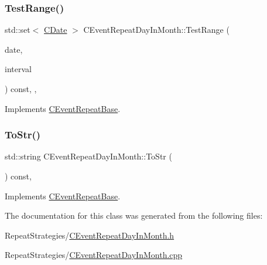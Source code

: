 \subsubsection{\texorpdfstring{Test\+Range()}{TestRange()}}
{\footnotesize\ttfamily std\+::set$<$ \mbox{\hyperlink{class_c_date}{C\+Date}} $>$ C\+Event\+Repeat\+Day\+In\+Month\+::\+Test\+Range (\begin{DoxyParamCaption}\item[{const \mbox{\hyperlink{class_c_date}{C\+Date}} \&}]{date,  }\item[{const \mbox{\hyperlink{class_c_date_af23472c977b14ed341b48183ec19d874}{C\+Date\+::\+Interval}} \&}]{interval }\end{DoxyParamCaption}) const\hspace{0.3cm}{\ttfamily [override]}, {\ttfamily [protected]}, {\ttfamily [virtual]}}



Implements \mbox{\hyperlink{class_c_event_repeat_base_ad8371820b1c9771c93b452e4c80f4cea}{C\+Event\+Repeat\+Base}}.

\mbox{\label{class_c_event_repeat_day_in_month_a5ec4554d0d7c1c9a50cd1f37f0d76673}} 
\subsubsection{\texorpdfstring{To\+Str()}{ToStr()}}
{\footnotesize\ttfamily std\+::string C\+Event\+Repeat\+Day\+In\+Month\+::\+To\+Str (\begin{DoxyParamCaption}{ }\end{DoxyParamCaption}) const\hspace{0.3cm}{\ttfamily [override]}, {\ttfamily [virtual]}}



Implements \mbox{\hyperlink{class_c_event_repeat_base_acf60d2b0890fdb3e701c944b26186197}{C\+Event\+Repeat\+Base}}.



The documentation for this class was generated from the following files\+:\begin{DoxyCompactItemize}
\item 
Repeat\+Strategies/\mbox{\hyperlink{_c_event_repeat_day_in_month_8h}{C\+Event\+Repeat\+Day\+In\+Month.\+h}}\item 
Repeat\+Strategies/\mbox{\hyperlink{_c_event_repeat_day_in_month_8cpp}{C\+Event\+Repeat\+Day\+In\+Month.\+cpp}}\end{DoxyCompactItemize}

